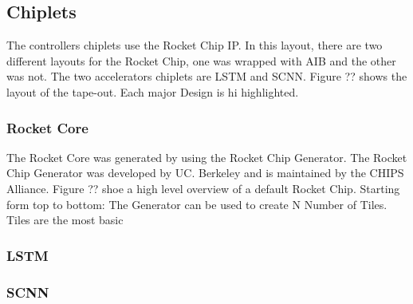 \documentclass[../main.tex]{subfiles}
\begin{document}
\subsection{Chiplets}
The controllers chiplets use the Rocket Chip IP\cite{Asanović:EECS-2016-17}. In this layout, there are two different layouts for the Rocket Chip, one was wrapped with AIB and the other was not. The two accelerators chiplets are LSTM and SCNN. Figure ?? shows the layout of the tape-out. Each major Design is hi highlighted. 
\subsubsection{Rocket Core}
The Rocket Core was generated by using the Rocket Chip Generator. The Rocket Chip Generator was developed by UC. Berkeley and is maintained by the CHIPS Alliance. Figure ?? shoe a high level overview of a default Rocket Chip. Starting form top to bottom: The Generator can be used to create N Number of Tiles. Tiles are the most basic 
\subsubsection{LSTM}
\blindtext
\subsubsection{SCNN}
\blindtext
\end{document}
